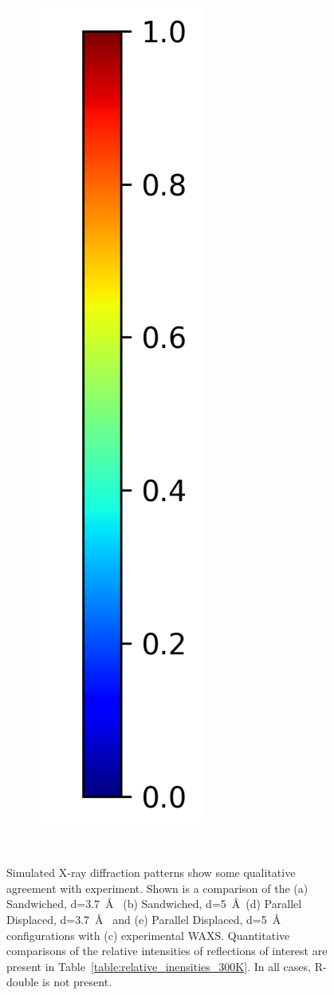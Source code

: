 \documentclass[journal=jpcbfk,manusciprt=article]{achemso}
\begin{document}
\begin{figure}[htb]
\begin{subfigure}{0.1\textwidth}
		\includegraphics[width=\linewidth]{colorbar_jet.png}
	\end{subfigure}	
	\caption{Simulated X-ray diffraction patterns show some qualitative agreement with 
	experiment. Shown is a comparison of the (a) Sandwiched, d=3.7~\AA~ (b) Sandwiched,
	d=5~\AA~(d) Parallel Displaced, d=3.7~\AA~ and (e) Parallel Displaced, d=5~\AA~ 
	configurations with (c) experimental WAXS. Quantitative comparisons of the relative 
	intensities of reflections of interest are present in Table~\ref{table:relative_inensities_300K}. 
	In all cases, R-double is not present.}~\label{fig:XRDsim} 
  \end{figure}
  
\end{document}
